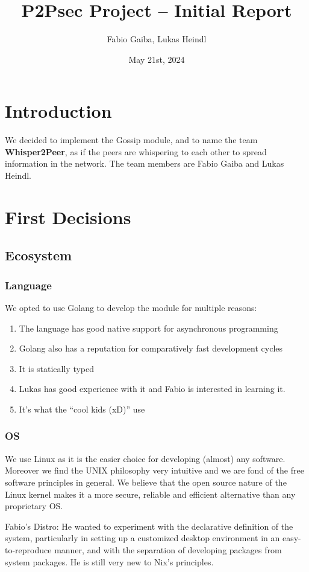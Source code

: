 \documentclass[a4paper,english,10pt,NET]{tumarticle}
\title{P2Psec Project -- Initial Report}
\author{Fabio Gaiba, Lukas Heindl}
\date{May 21st, 2024}
\begin{document}
\maketitle
\thispagestyle{tumarticle}

\section{Introduction}
We decided to implement the Gossip module, and to name the team \textbf{Whisper2Peer}, as if the peers are whispering to each other to spread information in the network. The team members are Fabio Gaiba and Lukas Heindl.

\section{First Decisions}
\subsection{Ecosystem}
\subsubsection{Language}
We opted to use Golang to develop the module for multiple reasons:

\begin{enumerate}
	\item The language has good native support for asynchronous programming 
	\item Golang also has a reputation for comparatively fast development cycles
	\item It is statically typed  
	\item Lukas has good experience with it and Fabio is interested in learning it.
	\item It's what the \enquote{cool kids (xD)} use
\end{enumerate}

\subsubsection{OS}
We use Linux as it is the easier choice for developing (almost) any software. Moreover we find the UNIX philosophy very intuitive and we are fond of the free software principles in general. We believe that the open source nature of the Linux kernel makes it a more secure, reliable and efficient alternative than any proprietary OS.

Fabio's Distro:
He wanted to experiment with the declarative definition of the system, particularly in setting up a customized desktop environment in an easy-to-reproduce manner, and with the separation of developing packages from system packages. He is still very new to Nix's principles.
\end{document}

